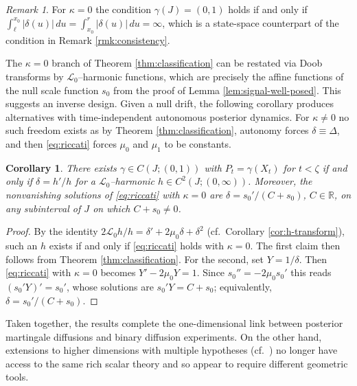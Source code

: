 \documentclass[11pt, reqno]{amsart}
\theoremstyle{plain}
\newtheorem{corollary}[theorem]{Corollary}
\theoremstyle{remark}
\newtheorem{remark}[theorem]{Remark}
\numberwithin{equation}{section}
\begin{document}
    
%
%
%
%
%
%
%
%
%
%
    
    
%
%
%
%
%
%
%
%
%
%
%
%
%

%
%
%
%
%
%
%
%
%
%

%
%
    
%
%
%
%
%
%

\begin{remark}\label{rmk:integral-criterion}
For $\kappa=0$ the condition $\gamma(J)=(0,1)$
holds if and only if
 $\int_\ell^{x_0}|\delta(u)|\,du=\int_{x_0}^{r}|\delta(u)|\,du=\infty$, which is a
state-space counterpart of the condition in Remark
\ref{rmk:consistency}.
\end{remark}

The $\kappa=0$ branch of Theorem \ref{thm:classification} can be restated via Doob
transforms by $\mathcal L_0$--harmonic functions, which are precisely the affine
functions of the null scale function $s_0$ from the proof of Lemma \ref{lem:signal-well-posed}. This suggests an inverse design. Given a null drift, the following corollary produces alternatives with time-independent autonomous posterior dynamics. For
$\kappa\neq0$ no such freedom exists as by Theorem \ref{thm:classification},
autonomy forces $\delta\equiv\Delta$, and then \eqref{eq:riccati} forces $\mu_0$
and $\mu_1$ to be constants.

\begin{corollary}\label{cor:inverse-design}
There exists $\gamma\in C(J;(0,1))$ with $P_t=\gamma(X_t)$ for $t<\zeta$ if and
only if $\delta=h'/h$ for a $\mathcal L_0$--harmonic
$h\in C^2(J;(0,\infty))$. Moreover, the nonvanishing solutions of
\eqref{eq:riccati} with $\kappa=0$ are $\delta=s_0'/(C+s_0)$, $C\in\mathbb R$,
on any subinterval of $J$ on which $C+s_0\neq0$.
\end{corollary}

\begin{proof}
By the identity $2\mathcal L_0h/h=\delta'+2\mu_0\delta+\delta^2$ (cf.~Corollary \ref{cor:h-transform}), such an $h$ exists if and only if \eqref{eq:riccati} holds with $\kappa=0$. The first claim then follows from Theorem \ref{thm:classification}. For the second, set $Y=1/\delta$. Then \eqref{eq:riccati} with $\kappa=0$ becomes $Y'-2\mu_0Y=1$. Since $s_0''=-2\mu_0s_0'$ this reads $(s_0'Y)'=s_0'$, whose solutions are $s_0'Y=C+s_0$; equivalently, $\delta=s_0'/(C+s_0)$.
\end{proof}

Taken together, the results complete the one-dimensional link between posterior martingale diffusions and binary diffusion experiments. On the other hand, extensions to higher dimensions with multiple hypotheses (cf.~\cite{bayraktar-wang2025, ekstrom2022multi}) no longer have access to the same rich scalar theory and so appear to require different geometric tools.
\end{document}
